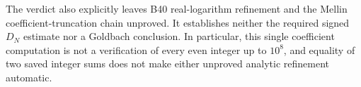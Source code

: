 The verdict also explicitly leaves B40 real-logarithm refinement and the
Mellin coefficient-truncation chain unproved. It establishes neither the
required signed $D_N$ estimate nor a Goldbach conclusion. In particular,
this single coefficient computation is not a verification of every even
integer up to $10^8$, and equality of two saved integer sums does not make
either unproved analytic refinement automatic.

